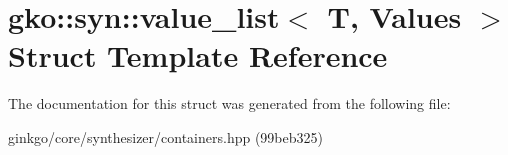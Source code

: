\hypertarget{structgko_1_1syn_1_1value__list}{}\section{gko\+:\+:syn\+:\+:value\+\_\+list$<$ T, Values $>$ Struct Template Reference}
\label{structgko_1_1syn_1_1value__list}


The documentation for this struct was generated from the following file\+:\begin{DoxyCompactItemize}
\item 
ginkgo/core/synthesizer/containers.\+hpp (99beb325)\end{DoxyCompactItemize}
